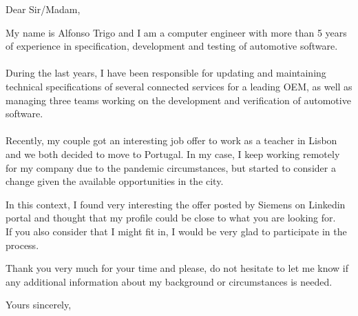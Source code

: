 \documentclass[]{letter}
\begin{document}

\begin{letter}{}{}

\opening{Dear Sir/Madam,}

My name is Alfonso Trigo and I am a computer engineer with more than 5 years of experience in specification, development and testing of automotive software.\\\\
During the last years, I have been responsible for updating and maintaining technical specifications of several connected services for a leading OEM, as well as managing three teams working on the development and verification of automotive software.\\\\
Recently, my couple got an interesting job offer to work as a teacher in Lisbon and we both decided to move to Portugal. In my case, I keep working remotely for my company due to the pandemic circumstances, but started to consider a change given the available opportunities in the city.

In this context, I found very interesting the offer posted by Siemens on Linkedin portal and thought that my profile could be close to what you are looking for.\\
If you also consider that I might fit in, I would be very glad to participate in the process.

Thank you very much for your time and please, do not hesitate to let me know if any additional information about my background or circumstances is needed.\\

\signature{Alfonso Trigo}
\closing{Yours sincerely,}



\end{letter}
\end{document}
